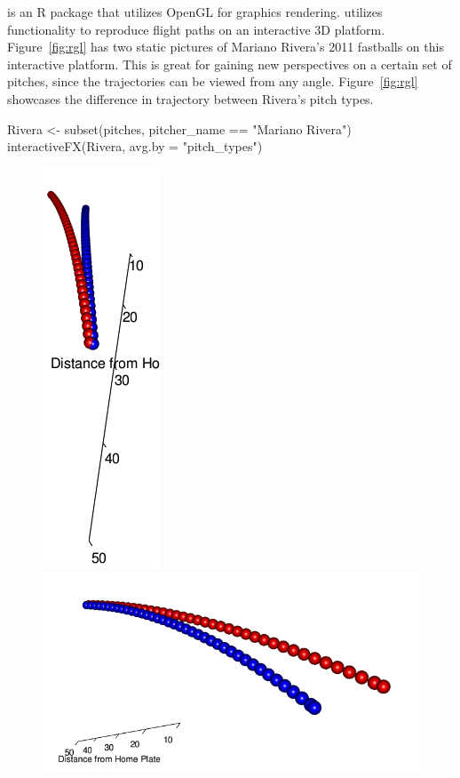 \begin{article}
 is an R package that utilizes OpenGL for graphics rendering.
 utilizes  functionality to reproduce
flight paths on an interactive 3D platform. Figure~\ref{fig:rgl}
has two static pictures of Mariano Rivera's 2011 fastballs on this
interactive platform. This is great for gaining new perspectives on
a certain set of pitches, since the trajectories can be viewed from
any angle. Figure~\ref{fig:rgl} showcases the difference in trajectory
between Rivera's pitch types.
%
\begin{Schunk}
\begin{Sinput}
Rivera <- subset(pitches, pitcher_name == "Mariano Rivera")
interactiveFX(Rivera, avg.by = "pitch_types")
\end{Sinput}
\end{Schunk}
%
\begin{figure}[h]
\begin{minipage}[t]{0.45\textwidth}%
\centerline{\includegraphics[scale = .45]{rgl_b.png}}%
\end{minipage}\hspace*{\fill}%
\begin{minipage}[t]{0.45\textwidth}%
\centerline{\includegraphics[scale = .45]{rgl_a.png}}%
\end{minipage}


\end{figure}
\end{article}

